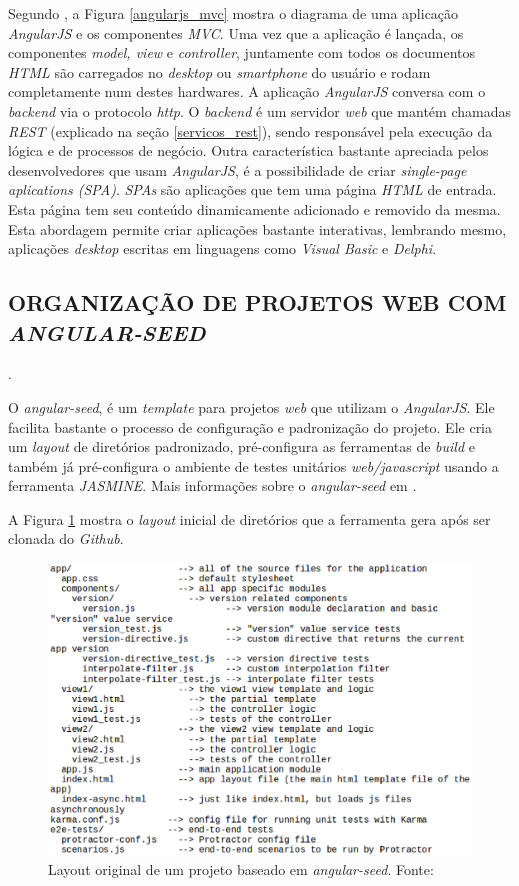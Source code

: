 Segundo , a Figura \ref{angularjs_mvc} mostra o diagrama de uma aplicação \emph{AngularJS} e os componentes \emph{MVC}.  Uma vez que a aplicação é lançada, os componentes \emph{model, view} e \emph{controller}, juntamente com todos os documentos \emph{HTML} são carregados no \emph{desktop} ou \emph{smartphone} do usuário e rodam completamente num destes hardwares.  A aplicação \emph{AngularJS} conversa com o \emph{backend} via o protocolo \emph{http}.  O \emph{backend} é um servidor \emph{web} que mantém chamadas \emph{REST} (explicado na seção \ref{servicos_rest}), sendo responsável pela execução da lógica e de processos de negócio.  
Outra característica bastante apreciada pelos desenvolvedores que usam \emph{AngularJS}, é a possibilidade de criar \emph{single-page aplications (SPA)}. 
\emph{SPAs} são aplicações que tem uma página \emph{HTML} de entrada. 
Esta página tem seu conteúdo dinamicamente adicionado e removido da mesma.
Esta abordagem permite criar aplicações bastante interativas, lembrando mesmo, aplicações \emph{desktop} escritas em linguagens como \emph{Visual Basic} e \emph{Delphi}.

\subsection{ORGANIZAÇÃO DE PROJETOS WEB COM \emph{ANGULAR-SEED}}.
\label{angular_seed}

O \emph{angular-seed}, é um \emph{template} para projetos \emph{web} que utilizam o \emph{AngularJS}. 
Ele facilita bastante o processo de configuração e padronização do projeto. 
Ele cria um \emph{layout} de diretórios padronizado, pré-configura as ferramentas de \emph{build} e também já pré-configura o ambiente de testes unitários \emph{web/javascript} usando a ferramenta \emph{JASMINE}. 
Mais informações sobre o \emph{angular-seed} em .

A Figura \ref{seed} mostra o \emph{layout} inicial de diretórios que a ferramenta gera após ser clonada do \emph{Github}.

\begin{figure}[ht]
	\centering
	\includegraphics[width=14cm]{figuras/seed.eps}
	\caption{Layout original de um projeto baseado em \emph{angular-seed}. Fonte: \cite{Google2015b}}
	\label{seed}
\end{figure}

